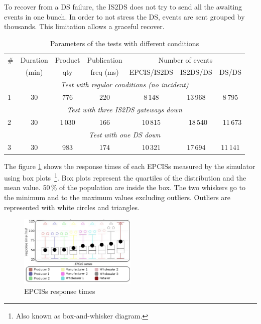 \documentclass[a4paper]{llncs}
\begin{document}
To recover from a DS failure, the IS2DS does not try to send all the awaiting
events in one bunch. In order to not stress the DS, events are sent grouped by
thousands. This limitation allows a graceful recover.

\begin{table}
\caption{Parameters of the tests with different conditions}
\begin{center}
\begin{tabular}{|l|c|c|c|c|c|c|}
 \hline
 \# &  Duration & Product & Publication & \multicolumn{3}{c|}{Number of events} \\
 \cline{5-7}
  &   (min)              & qty &  freq (ms) & EPCIS/IS2DS & IS2DS/DS & DS/DS \\
 \hline
 \hline
 \multicolumn{7}{|c|}{\textit{Test with regular conditions (no incident)}} \\
 \hline
 1 & 30 & 776 & 220 & 8\,148 & 13\,968 & 8\,795 \\
 \hline
 \hline
 \multicolumn{7}{|c|}{\textit{Test with three IS2DS gateways down}} \\
 \hline
 2 & 30 & 1\,030 & 166 & 10\,815& ~18\,540 & ~11\,673 \\
 \hline \hline
 \multicolumn{7}{|c|}{\textit{Test with one DS down}} \\
 \hline
 3 & 30 & 983 & 174 & 10\,321 & 17\,694 & 11\,141 \\
 \hline
\end{tabular}
\end{center}
\label{testCond}
\end{table}

The figure \ref{fig:boxPlot} shows the response times of each EPCISs measured
by the simulator using box plots~\footnote{Also known as box-and-whisker
  diagram.}. Box plots represent the quartiles of the 
distribution and the mean value. 50\,\% of the population are inside the box.
The two whiskers go to the minimum and to the maximum values excluding
outliers. Outliers are represented with white circles and triangles.

\begin{figure}[htb]
\centering
\includegraphics[width=0.5\textwidth]{iota_visuel/plot_box_test_3h.png}
\caption{EPCISs response times}
\label{fig:boxPlot}
\end{figure}
\end{document}
